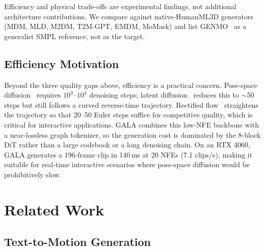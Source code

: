 \documentclass[journal]{IEEEtran}
\begin{document}
Efficiency and physical trade-offs are experimental findings, not additional architecture contributions. We compare against native-HumanML3D generators (MDM, MLD, M2DM, T2M-GPT, EMDM, MoMask) and list GENMO~\cite{li2025genmo} as a generalist SMPL reference, not as the target.

\subsection{Efficiency Motivation}

Beyond the three quality gaps above, efficiency is a practical concern. Pose-space diffusion~\cite{tevet2023mdm} requires $10^3$--$10^4$ denoising steps; latent diffusion~\cite{chen2023mld} reduces this to $\sim$50 steps but still follows a curved reverse-time trajectory. Rectified flow~\cite{liu2023rectified,lipman2023flow} straightens the trajectory so that 20--50 Euler steps suffice for competitive quality, which is critical for interactive applications. GALA combines this low-NFE backbone with a near-lossless graph tokenizer, so the generation cost is dominated by the 8-block DiT rather than a large codebook or a long denoising chain. On an RTX 4060, GALA generates a 196-frame clip in 140\,ms at 20 NFEs (7.1 clips/s), making it suitable for real-time interactive scenarios where pose-space diffusion would be prohibitively slow.

\section{Related Work}

\subsection{Text-to-Motion Generation}
\label{sec:rw-t2m}
\end{document}
